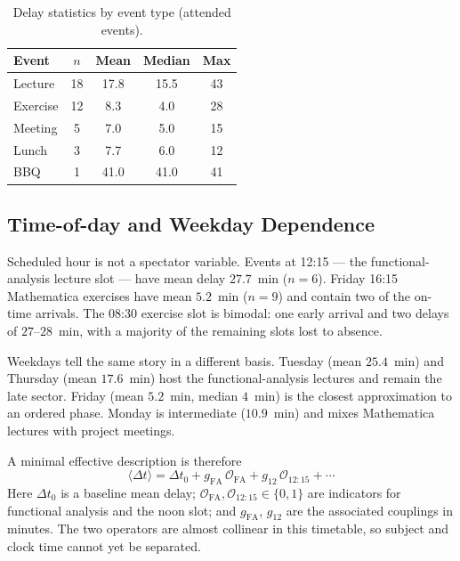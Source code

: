 \documentclass[10pt,twocolumn]{article}
\begin{document}
\begin{table}[H]
\centering
\caption{Delay statistics by event type (attended events).}
\label{tab:event}
\small
\begin{tabular}{lcccc}
\toprule
Event & $n$ & Mean & Median & Max \\
\midrule
Lecture  & 18 & 17.8 & 15.5 & 43 \\
Exercise & 12 &  8.3 &  4.0 & 28 \\
Meeting  &  5 &  7.0 &  5.0 & 15 \\
Lunch    &  3 &  7.7 &  6.0 & 12 \\
BBQ      &  1 & 41.0 & 41.0 & 41 \\
\bottomrule
\end{tabular}
\end{table}

\subsection{Time-of-day and Weekday Dependence}

Scheduled hour is not a spectator variable. Events at 12:15
--- the functional-analysis lecture slot --- have mean delay
$27.7$~min ($n=6$). Friday 16:15 Mathematica exercises
have mean $5.2$~min ($n=9$) and contain two of the
on-time arrivals. The 08:30 exercise slot is bimodal:
one early arrival and two delays of $27$--$28$~min,
with a majority of the remaining slots lost to absence.

Weekdays tell the same story in a different basis. Tuesday
(mean $25.4$~min) and Thursday (mean $17.6$~min)
host the functional-analysis lectures and remain the late
sector. Friday (mean $5.2$~min, median $4$~min) is the
closest approximation to an ordered phase. Monday is
intermediate ($10.9$~min) and mixes Mathematica lectures
with project meetings.

A minimal effective description is therefore
\begin{equation}
    \langle\Delta t\rangle
    =
    \Delta t_0
    + g_{\mathrm{FA}}\,\mathcal{O}_{\mathrm{FA}}
    + g_{12}\,\mathcal{O}_{12:15}
    + \cdots
\end{equation}
Here $\Delta t_0$ is a baseline mean delay;
$\mathcal{O}_{\mathrm{FA}},\mathcal{O}_{12:15}\in\{0,1\}$ 
are indicators for functional analysis and the
noon slot; and $g_{\mathrm{FA}}$, $g_{12}$ are the
associated couplings in minutes.
The two operators are almost collinear in this timetable,
so subject and clock time cannot yet be separated.
\end{document}
